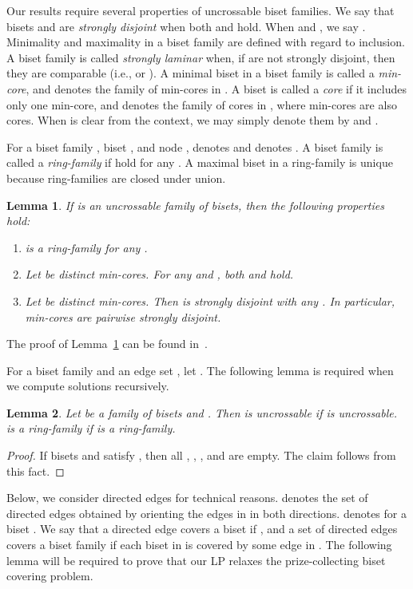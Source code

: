 \documentclass[11pt]{article}
\newtheorem{lemma}{Lemma}
\begin{document}
Our results require several properties of uncrossable biset families.
We say that bisets  and  are {\em strongly disjoint}
when both  and  hold.
When  and ,
we say .
Minimality and maximality in a biset family are defined with regard to
inclusion.
A biset family  is called {\em strongly laminar}
when, if  are not strongly disjoint, then 
they are comparable (i.e.,
 or ).
A minimal biset in a biset family  is called a {\em min-core}, and
 denotes the family of min-cores in .
A biset is called a {\em core} if it includes only one min-core, and 
 denotes the family of cores in ,
where min-cores are also cores.
When  is clear from the context, we may simply denote them
by  and .

For a biset family , biset , and node , 
 denotes 
and  denotes .
A biset family  is called a {\em ring-family}
if
 hold
for any .
A maximal biset in a ring-family is unique because ring-families are closed under union.


\begin{lemma}\label{lem.uncrossable}
If  is an uncrossable family of bisets, then the following properties hold\/{\rm :}
\begin{enumerate}
 \item[\rm (i)]  is a ring-family for any 
	      .
 \item[\rm (ii)] Let  be distinct min-cores.
	      For any  and , 
	      both 
	      and 
	      hold.
 \item[\rm (iii)] Let  be distinct min-cores.
	      Then  is strongly disjoint with
	      any .
	      In particular, min-cores are pairwise strongly disjoint.
\end{enumerate}
\end{lemma}

The proof of Lemma~\ref{lem.uncrossable} can be found
in~\cite{Nutov12uncrossable}. 

For a biset family  and an edge set , let .
The following lemma is required when we compute solutions recursively.

\begin{lemma}\label{lem.residual-uncrossable}
 Let  be a family of bisets and .
 Then  is
 uncrossable if  is uncrossable.
  is a ring-family if  is a ring-family.
\end{lemma}
\begin{proof}
If bisets  and  satisfy
,
then 
all , ,
, and 
are empty.
The claim follows from this fact.
\end{proof}


Below, we consider directed edges for technical reasons.
 denotes the set of directed edges obtained by orienting the edges
in  in both directions.
 denotes  for a biset .
We say that a directed edge  covers a biset  if ,
and a set  of directed edges covers a biset family  if each
biset in  is covered by some edge in .
The following lemma will be required to prove that our LP relaxes the
prize-collecting biset covering problem.
\end{document}
